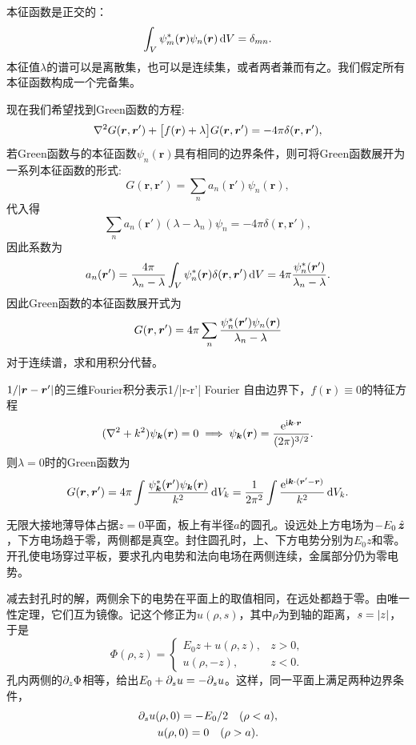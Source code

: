 本征函数是正交的：
\begin{equation}
    \label{eq:ed-orthonormal-green-eigenmodes}
    \int_V\psi_m^\ast(\bm r)\psi_n(\bm r)\mathop{}\!\mathrm{d} V = \delta_{mn}.
\end{equation}
本征值$\lambda$的谱可以是离散集，也可以是连续集，或者两者兼而有之。我们假定所有本征函数构成一个完备集。

现在我们希望找到Green函数的方程:
\begin{equation}
    \nabla^2 G(\bm r,\bm r') + \bigl[f(\bm r) + \lambda\bigr]G(\bm r,\bm r') = -4\pi\delta(\bm r,\bm r'),
\end{equation}
若Green函数与的本征函数$\psi_n(\bm r)$具有相同的边界条件，则可将Green函数展开为一系列本征函数的形式:
\[
    G(\bm r,\bm r') = \sum_n a_n(\bm r')\psi_n(\bm r),
\]
代入得
\[
    \sum_n a_n(\bm r')(\lambda - \lambda_n)\psi_n = -4\pi\delta(\bm r,\bm r'),
\]
因此系数为
\[
    a_n(\bm r') = \frac{4\pi}{\lambda_n - \lambda}\int_V\psi_n^\ast(\bm r)\delta(\bm r,\bm r')\mathop{}\!\mathrm{d} V = 4\pi\frac{\psi_n^\ast(\bm r')}{\lambda_n - \lambda}.
\]
因此Green函数的本征函数展开式为
\begin{equation}
    G(\bm r,\bm r') = 4\pi\sum_n \frac{\psi_n^\ast(\bm r')\psi_n(\bm r)}{\lambda_n - \lambda}
\end{equation}
对于连续谱，求和用积分代替。
\begin{example}{$1/\lvert\bm r - \bm r'\rvert$的三维Fourier积分表示}{1/|r-r'| Fourier}
    自由边界下，$f(\bm r) \equiv 0$的特征方程
    \[
        (\nabla^2 + k^2)\psi_{\bm k}(\bm r) = 0 \implies \psi_{\bm k}(\bm r) = \frac{\mathop{}\!\mathrm{e}^{\mathrm{i}\bm k\cdot\bm r}}{(2\pi)^{3/2}}.
    \]
    则$\lambda = 0$时的Green函数为
    \[
        G(\bm r,\bm r') = 4\pi\int\frac{\psi_{\bm k}^\ast(\bm r')\psi_{\bm k}(\bm r)}{k^2}\mathop{}\!\mathrm{d} V_k = \frac1{2\pi^2}\int\frac{\mathop{}\!\mathrm{e}^{\mathrm{i}\bm k\cdot(\bm r'-\bm r)}}{k^2}\mathop{}\!\mathrm{d} V_k.
    \]
\end{example}

\label{sec:mixed boundary condition}

无限大接地薄导体占据$z = 0$平面，板上有半径$a$的圆孔。设远处上方电场为$-E_0\mathop{}\!\hat{\bm{z}}$，下方电场趋于零，两侧都是真空。封住圆孔时，上、下方电势分别为$E_0 z$和零。开孔使电场穿过平板，要求孔内电势和法向电场在两侧连续，金属部分仍为零电势。

减去封孔时的解，两侧余下的电势在平面上的取值相同，在远处都趋于零。由唯一性定理，它们互为镜像。记这个修正为$u(\rho,s)$，其中$\rho$为到轴的距离，$s = \lvert z\rvert$，于是
\[
    \Phi(\rho,z) =
    \begin{cases}
        E_0 z + u(\rho,z),&z > 0,\\
        u(\rho,-z),&z < 0.
    \end{cases}
\]
孔内两侧的$\partial_z\Phi$相等，给出$E_0 + \partial_s u = -\partial_s u$。这样，同一平面上满足两种边界条件，
\begin{subequations}
    \begin{gather}
        \partial_s u(\rho,0) = -E_0/2\quad(\rho < a),\\
        u(\rho,0) = 0\quad(\rho > a).
    \end{gather}
\end{subequations}

